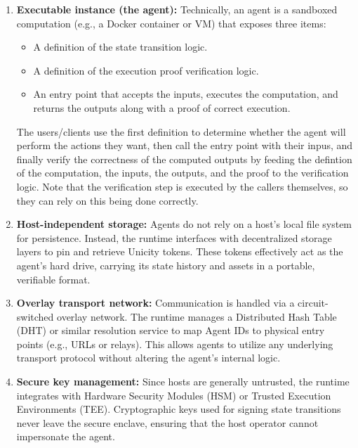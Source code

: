 \documentclass{article}
\begin{document}
\begin{enumerate}
    \item \textbf{Executable instance (the agent):}
    Technically, an agent is a sandboxed computation (e.g., a Docker container or VM) that exposes three items:
    \begin{itemize}
        \item A definition of the state transition logic.

        \item A definition of the execution proof verification logic.

        \item An entry point that accepts the inputs, executes the computation, and returns the outputs along with a proof of correct execution.
    \end{itemize}
    The users/clients use the first definition to determine whether the agent will perform the actions they want, then call the entry point with their inpus, and finally verify the correctness of the computed outputs by feeding the defintion of the computation, the inputs, the outputs, and the proof to the verification logic. Note that the verification step is executed by the callers themselves, so they can rely on this being done correctly.

    \item \textbf{Host-independent storage:}
    Agents do not rely on a host's local file system for persistence. Instead, the runtime interfaces with decentralized storage layers to pin and retrieve Unicity tokens. These tokens effectively act as the agent's hard drive, carrying its state history and assets in a portable, verifiable format.

    \item \textbf{Overlay transport network:}
    Communication is handled via a circuit-switched overlay network. The runtime manages a Distributed Hash Table (DHT) or similar resolution service to map Agent IDs to physical entry points (e.g., URLs or relays). This allows agents to utilize any underlying transport protocol without altering the agent's internal logic.

    \item \textbf{Secure key management:}
    Since hosts are generally untrusted, the runtime integrates with Hardware Security Modules (HSM) or Trusted Execution Environments (TEE). Cryptographic keys used for signing state transitions never leave the secure enclave, ensuring that the host operator cannot impersonate the agent.
\end{enumerate}
\end{document}
